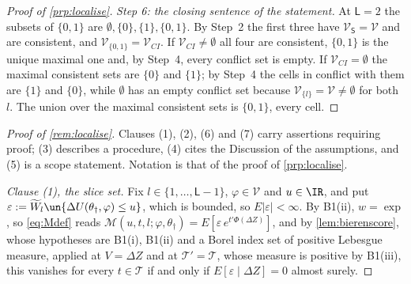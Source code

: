 \begin{proof}[Proof of \cref{prp:localise}]
\emph{Step 6: the closing sentence of the statement.} At $\mathsf L=2$ the subsets of
$\{0,1\}$ are $\emptyset,\{0\},\{1\},\{0,1\}$. By Step~2 the first three have
$\mathcal V_{\mathsf S}=\mathcal V$ and are consistent, and $\mathcal V_{\{0,1\}}=\mathcal V_{CI}$. If
$\mathcal V_{CI}\neq\emptyset$ all four are consistent, $\{0,1\}$ is the unique maximal one and, by
Step~4, every conflict set is empty. If $\mathcal V_{CI}=\emptyset$ the maximal consistent sets are
$\{0\}$ and $\{1\}$; by Step~4 the cells in conflict with them are $\{1\}$ and $\{0\}$, while
$\emptyset$ has an empty conflict set because $\mathcal V_{\{l\}}=\mathcal V\neq\emptyset$ for both
$l$. The union over the maximal consistent sets is $\{0,1\}$, every cell.
\end{proof}

\begin{proof}[Proof of \cref{rem:localise}]
Clauses \textup{(1)}, \textup{(2)}, \textup{(6)} and \textup{(7)} carry assertions requiring proof;
\textup{(3)} describes a procedure, \textup{(4)} cites the Discussion of the assumptions, and
\textup{(5)} is a scope statement. Notation is that of the proof of \cref{prp:localise}.

\emph{Clause \textup{(1)}, the slice set.} Fix $l\in\{1,\dots,\mathsf L-1\}$, $\varphi\in\mathcal V$
and $u\in\IR$, and put $\varepsilon:=\widetilde W_l\un\{\Delta U(\theta_\dagger,\varphi)\le u\}$,
which is bounded, so $E|\varepsilon|<\infty$. By B1(ii), $w=\exp$, so \eqref{eq:Mdef} reads
$\mathcal M(u,t,l;\varphi,\theta_\dagger)=E[\varepsilon\,e^{t'\Phi(\Delta Z)}]$, and by
\cref{lem:bierenscore}, whose hypotheses are B1(i), B1(ii) and a Borel index set of positive Lebesgue
measure, applied at $V=\Delta Z$ and at $\mathcal T'=\mathcal T$, whose measure is positive by B1(iii),
this
vanishes for every $t\in\mathcal T$ if and only if $E[\varepsilon\mid\Delta Z]=0$ almost surely.


\end{proof}
